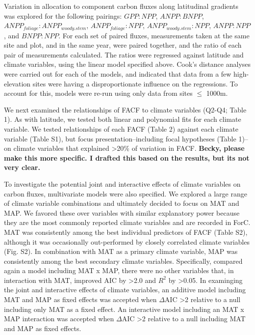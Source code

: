 \documentclass[]{article}
\begin{document}
Variation in allocation to component carbon fluxes along latitudinal
gradients was explored for the following pairings: \(GPP:NPP\),
\(ANPP:BNPP\), \(ANPP_{foliage}:ANPP_{woody.stem}\),
\(ANPP_{foliage}:NPP\), \(ANPP_{woody.stem}:NPP\), \(ANPP:NPP\), and
\(BNPP:NPP\). For each set of paired fluxes, measurements taken at the
same site and plot, and in the same year, were paired together, and the
ratio of each pair of measurements calculated. The ratios were regressed
against latitude and climate variables, using the linear model specified
above. Cook's distance analyses were carried out for each of the models,
and indicated that data from a few high-elevation sites were having a
disproportionate influence on the regressions. To account for this,
models were re-run using only data from sites \(\le\) 1000m.

We next examined the relationships of FACF to climate variables (Q2-Q4;
Table 1). As with latitude, we tested both linear and polynomial fits
for each climate variable. We tested relationships of each FACF (Table
2) against each climate variable (Table S1), but focus
presentation--including focal hypotheses (Table 1)--on climate variables
that explained \textgreater{}20\% of variation in FACF. \textbf{Becky,
please make this more specific. I drafted this based on the results, but
its not very clear.}

To investigate the potential joint and interactive effects of climate
variables on carbon fluxes, multivariate models were also specified. We
explored a large range of climate variable combinations and ultimately
decided to focus on MAT and MAP. We favored these over variables with
similar explanatory power because they are the most commonly reported
climate variables and are recorded in ForC. MAT was consistently among
the best individual predictors of FACF (Table S2), although it was
occasionally out-performed by closely correlated climate variables (Fig.
S2). In combination with MAT as a primary climate variable, MAP was
consistently among the best secondary climate variables. Specifically,
compared again a model including MAT x MAP, there were no other
variables that, in interaction with MAT, improved AIC by
\textgreater{}2.0 and \(R^2\) by \textgreater{}0.05. In examinging the
joint and interactive effects of climate variables, an additive model
including MAT and MAP as fixed effects was accepted when \(\Delta\)AIC
\textgreater{}2 relative to a null including only MAT as a fixed effect.
An interactive model including an MAT x MAP interaction was accepted
when \(\Delta\)AIC \textgreater{}2 relative to a null including MAT and
MAP as fixed effects.
\end{document}
